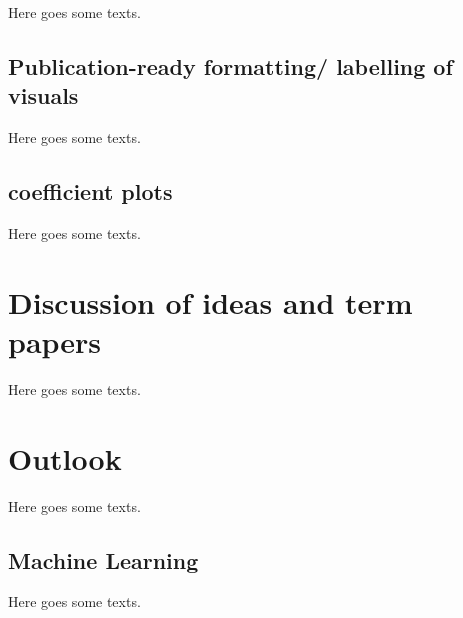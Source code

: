 \documentclass[
]{book}
\begin{document}
Here goes some texts.

\hypertarget{publication-ready-formatting-labelling-of-visuals}{%
\section{Publication-ready formatting/ labelling of visuals}\label{publication-ready-formatting-labelling-of-visuals}}

Here goes some texts.

\hypertarget{coefficient-plots}{%
\section{coefficient plots}\label{coefficient-plots}}

Here goes some texts.

\hypertarget{dis-paper}{%
\chapter{Discussion of ideas and term papers}\label{dis-paper}}

Here goes some texts.

\hypertarget{out-look}{%
\chapter{Outlook}\label{out-look}}

Here goes some texts.

\hypertarget{machine-learning}{%
\section{Machine Learning}\label{machine-learning}}

Here goes some texts.

  
\end{document}

